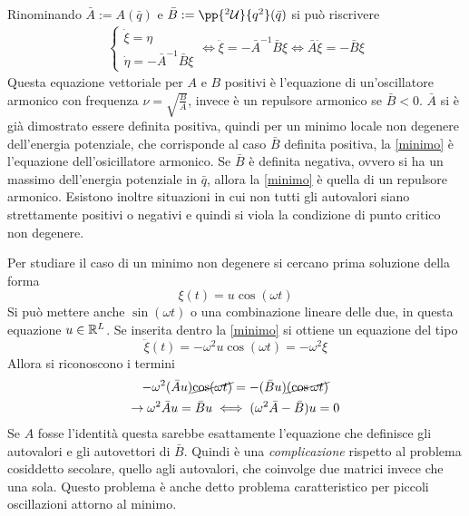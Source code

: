 \documentclass[Main.tex]{subfiles}
\begin{document}
Rinominando $ \bar A := A(\bar q) $ e $\bar B := \pp{^2 \U}{q^2}(\bar q)$ si può riscrivere
\begin{gather} \label{minimo}
	\begin{cases}
		\dot \xi = \eta \\
		\dot \eta = - \bar A^{-1} \bar B \xi 
	\end{cases} \iff \ddot \xi =- \bar A^{-1} \bar B \xi \iff \boxed{\bar A \ddot \xi = - \bar B \xi }
\end{gather}
Questa equazione vettoriale per $A$ e $B$ positivi è l'equazione di un'oscillatore armonico con frequenza $\nu =\sqrt{\frac{B}{A}}$, invece è un repulsore armonico se $\bar B <0$. $\bar A$ si è già dimostrato essere definita positiva, quindi per un minimo locale non degenere dell'energia potenziale, che corrisponde al caso $\bar B$ definita positiva, la \eqref{minimo} è l'equazione dell'osicillatore armonico. Se $\bar B$ è definita negativa, ovvero si ha un massimo dell'energia potenziale in $\bar q$, allora la \eqref{minimo} è quella di un repulsore armonico. Esistono inoltre situazioni in cui non tutti gli autovalori siano strettamente positivi o negativi e quindi si viola la condizione di punto critico non degenere.


	Per studiare il caso di un minimo non degenere si cercano prima soluzione della forma 
	\begin{equation}
		\xi(t) = u \cos ( \omega t)
	\end{equation}
	Si può mettere anche $\sin(\omega t)$ o una combinazione lineare delle due, in questa equazione $u \in \mathbb{R}^L$.
	Se inserita dentro la \eqref{minimo} si ottiene un equazione del tipo
	\begin{equation}
		\ddot \xi (t) = - \omega^2 u \cos ( \omega t) = - \omega^2 \xi 
	\end{equation}
	Allora si riconoscono i termini
	\begin{gather}
		- \omega^2 ( \bar A u) \cancel{\cos( \omega t)} = - ( \bar B u) \cancel{(\cos \omega t )}\\
		\rightarrow \omega^2 \bar A u = \bar B u \iff  (\omega^2 \bar A - \bar B ) u=0
	\end{gather}
	Se $A$ fosse l'identità questa sarebbe  esattamente l'equazione che definisce gli autovalori e gli autovettori di $\bar B$. Quindi è una \emph{complicazione} rispetto al problema  cosiddetto secolare, quello agli autovalori, che coinvolge due matrici invece che una sola. Questo problema è anche detto problema caratteristico per piccoli oscillazioni attorno al minimo.
	
\end{document}
